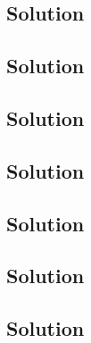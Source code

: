 \documentclass{article}
\begin{document}
\subsection{}
\clearpage
\subsection{Solution}
\clearpage
\subsection{}
\clearpage
\subsection{Solution}
\clearpage
\subsection{}
\clearpage
\subsection{Solution}
\clearpage
\subsection{}
\clearpage
\subsection{Solution}
\clearpage
\subsection{}
\clearpage
\subsection{Solution}
\clearpage
\subsection{}
\clearpage
\subsection{Solution}
\clearpage
\subsection{}
\clearpage
\subsection{Solution}
\clearpage
\end{document}
